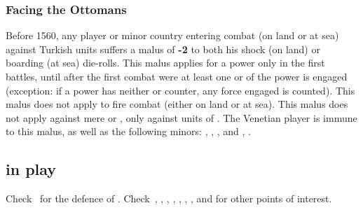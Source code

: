 \subsubsection{Facing the Ottomans}
\aparag Before 1560, any player or minor country entering combat (on
land or at sea) against Turkish units suffers a malus of {\bf -2} to
both his shock (on land) or boarding (at sea) die-rolls.
\aparag This malus applies for a power only in the first battles, until
after the first combat were at least one \ARMY or \FLEET of the power is
engaged (exception: if a power has neither \ARMY or \FLEET counter, any
force engaged is counted).  This malus does not apply to fire combat
(either on land or at sea). This malus does not apply against mere
\VASSAL or \TUR, only against units of \TUR.
\aparag
The Venetian player is immune to this malus, as well as the following
minors: , , ,  and
, .




\subsection{ in play}

Check~ for the defence of
. Check~,
, ,
, ,
, ,
 and 
for other points of interest.

